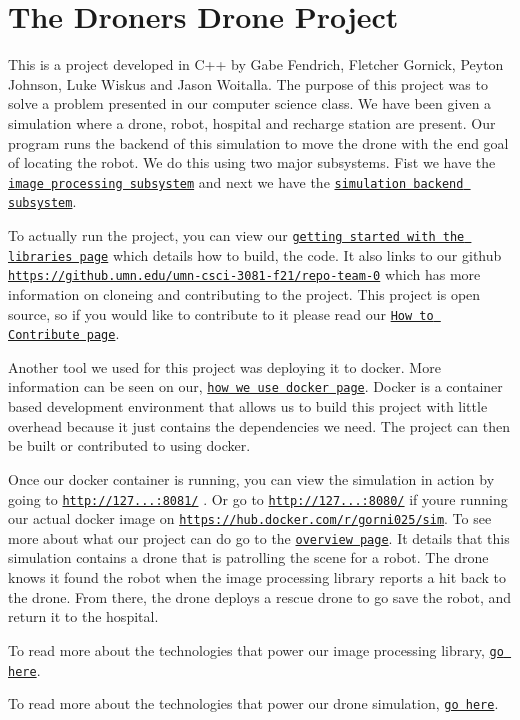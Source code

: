 \hypertarget{index_intro_sec}{}\section{The Droner\textquotesingle{}s Drone Project}\label{index_intro_sec}
This is a project developed in C++ by Gabe Fendrich, Fletcher Gornick, Peyton Johnson, Luke Wiskus and Jason Woitalla. The purpose of this project was to solve a problem presented in our computer science class. We have been given a simulation where a drone, robot, hospital and recharge station are present. Our program runs the backend of this simulation to move the drone with the end goal of locating the robot. We do this using two major subsystems. Fist we have the \href{image_processing_description.html}{\tt image processing subsystem} and next we have the \href{simulation_description.html}{\tt simulation backend subsystem}.

To actually run the project, you can view our \href{getting_started.html}{\tt getting started with the libraries page} which details how to build, the code. It also links to our github \href{https://github.umn.edu/umn-csci-3081-f21/repo-team-0}{\tt https\+://github.\+umn.\+edu/umn-\/csci-\/3081-\/f21/repo-\/team-\/0} which has more information on cloneing and contributing to the project. This project is open source, so if you would like to contribute to it please read our \href{how_to_contribute.html}{\tt How to Contribute page}.

Another tool we used for this project was deploying it to docker. More information can be seen on our, \href{how_to_use_docker.html}{\tt how we use docker page}. Docker is a container based development environment that allows us to build this project with little overhead because it just contains the dependencies we need. The project can then be built or contributed to using docker.

Once our docker container is running, you can view the simulation in action by going to \href{http://127.0.0.1:8081/}{\tt http\+://127...\+:8081/} . Or go to \href{http://127.0.0.1:8080/}{\tt http\+://127...\+:8080/} if you\textquotesingle{}re running our actual docker image on \href{https://hub.docker.com/r/gorni025/sim}{\tt https\+://hub.\+docker.\+com/r/gorni025/sim}. To see more about what our project can do go to the \href{overview.html}{\tt overview page}. It details that this simulation contains a drone that is patrolling the scene for a robot. The drone knows it found the robot when the image processing library reports a hit back to the drone. From there, the drone deploys a rescue drone to go save the robot, and return it to the hospital.

To read more about the technologies that power our image processing library, \href{image_processing_description.html}{\tt go here}.

To read more about the technologies that power our drone simulation, \href{simulation_description.html}{\tt go here}. 